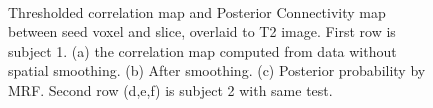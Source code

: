 \documentclass[runningheads,a4paper]{llncs}
\begin{document}
\begin{figure}[htb]
  \centering 
  \\

  \caption[]{Thresholded correlation map and Posterior Connectivity
    map between seed voxel and slice, overlaid to T2 image.  First row
    is subject 1. (a) the correlation map computed from data without
    spatial smoothing. (b) After smoothing. (c) Posterior probability
    by MRF. Second row (d,e,f) is subject 2 with same test. }
  \label{fig:2}
\end{figure}
\end{document}
